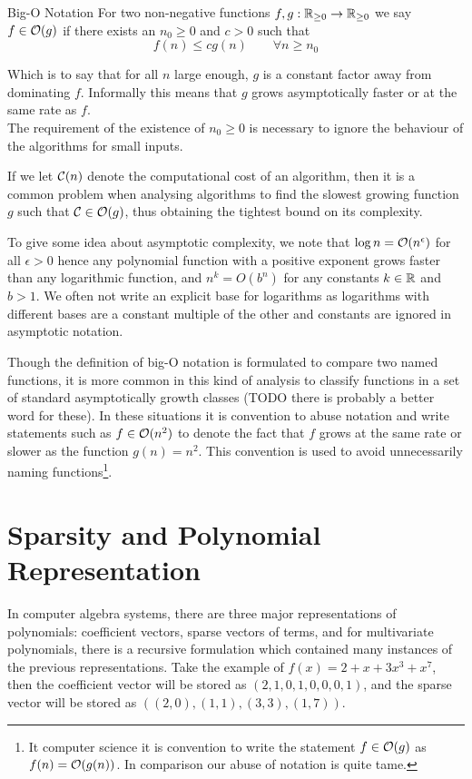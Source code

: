 \begin{definition}{Big-O Notation}
    For two non-negative functions $f, g: {\mathbb R}_{\ge 0} \to {\mathbb R}_{\ge 0}$ we say $f \in \mathcal O(g)$ if there exists an $n_0 \ge 0$ and $c > 0$ such that
    \begin{equation}\label{eq:big-o}
        f(n) \le cg(n) \qquad \forall n \ge n_0
    \end{equation}
\end{definition}
Which is to say that for all $n$ large enough, $g$ is a constant factor away from dominating $f$. Informally this means that $g$ grows asymptotically faster or at the same rate as $f$.\\
The requirement of the existence of $n_0 \ge 0$ is necessary to ignore the behaviour of the algorithms for small inputs.

If we let $\mathcal C(n)$ denote the computational cost of an algorithm, then it is a common problem when analysing algorithms to find the slowest growing function $g$ such that $\mathcal C \in \mathcal O(g)$, thus obtaining the tightest bound on its complexity.

To give some idea about asymptotic complexity, we note that $\log n = \mathcal O(n^\epsilon)$ for all $\epsilon > 0$ hence any polynomial function with a positive exponent grows faster than any logarithmic function, and $n^k = O(b^n)$ for any constants $k \in {\mathbb R}$ and $b > 1$. We often not write an explicit base for logarithms as logarithms with different bases are a constant multiple of the other and constants are ignored in asymptotic notation.

Though the definition of big-O notation is formulated to compare two named functions, it is more common in this kind of analysis to classify functions in a set of standard asymptotically growth classes (TODO there is probably a better word for these). In these situations it is convention to abuse notation and write statements such as $f \in \mathcal O(n^2)$ to denote the fact that $f$ grows at the same rate or slower as the function $g(n) = n^2$. This convention is used to avoid unnecessarily naming functions\footnote{It computer science it is convention to write the statement $f \in \mathcal O(g)$ as $f(n) = \mathcal O(g(n))$. In comparison our abuse of notation is quite tame.}.

\section{Sparsity and Polynomial Representation}

In computer algebra systems, there are three major representations of polynomials: coefficient vectors, sparse vectors of terms, and for multivariate polynomials, there is a recursive formulation which contained many instances of the previous representations. Take the example of $f(x) = 2 + x + 3x^3 + x^7$, then the coefficient vector will be stored as $(2, 1, 0, 1, 0, 0, 0, 1)$, and the sparse vector will be stored as $((2, 0), (1, 1), (3, 3), (1, 7))$.

